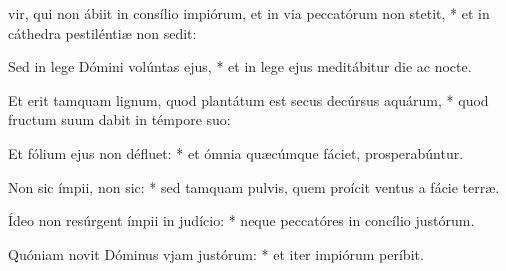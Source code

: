 \begin{psalmus}

     vir, qui non ábiit in consílio impiórum, et in via peccatórum non stetit, * et in cáthedra pestiléntiæ non sedit:

    Sed in lege Dómini volúntas ejus, * et in lege ejus meditábitur die ac nocte.

    Et erit tamquam lignum, quod plantátum est secus decúrsus aquárum, * quod fructum suum dabit in témpore suo:

    Et fólium ejus non défluet: * et ómnia quæcúmque fáciet, prosperabúntur.

    Non sic ímpii, non sic: * sed tamquam pulvis, quem proícit ventus a fácie terræ.

    Ídeo non resúrgent ímpii in judício: * neque peccatóres in concílio justórum.

    Quóniam novit Dóminus vjam justórum: * et iter impiórum períbit.

\end{psalmus}
